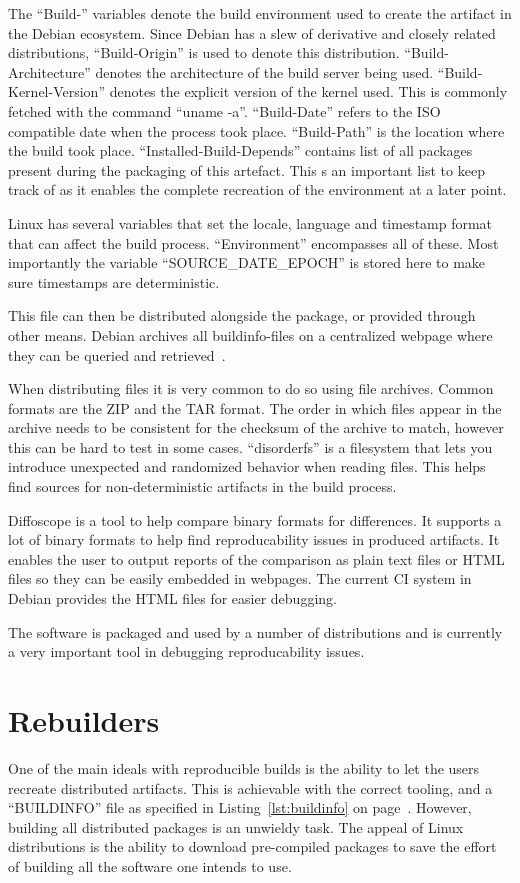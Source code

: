 \documentclass[../Main/thesis.tex]{subfiles}
\begin{document}
The ``Build-'' variables denote the build environment used to create the
artifact in the Debian ecosystem. Since Debian has a slew of derivative and
closely related distributions, ``Build-Origin'' is used to denote this
distribution.  ``Build-Architecture'' denotes the architecture of the build
server being used.  ``Build-Kernel-Version'' denotes the explicit  version of
the kernel used. This is commonly fetched with the command ``uname -a''.
``Build-Date'' refers to the ISO compatible date when the process took place.
``Build-Path'' is the location where the build took place.
``Installed-Build-Depends'' contains list of all packages present during the
packaging of this artefact. This s an important list to keep track of as it
enables the complete recreation of the environment at a later point.

Linux has several variables that set the locale, language and timestamp format
that can affect the build process. ``Environment'' encompasses all of these.
Most importantly the variable ``SOURCE\_DATE\_EPOCH'' is stored here to make
sure timestamps are deterministic.

This file can then be distributed alongside the package, or provided through
other means. Debian archives all buildinfo-files on a centralized webpage where
they can be queried and retrieved~\cite{buildinfo-debian}.

When distributing files it is very common to do so using file archives. Common
formats are the ZIP and the TAR format. The order in which files appear in the
archive needs to be consistent for the checksum of the archive to match, however
this can be hard to test in some cases. ``disorderfs'' is a filesystem that lets
you introduce unexpected and randomized behavior when reading files. This helps
find sources for non-deterministic artifacts in the build process.

Diffoscope is a tool to help compare binary formats for differences. It supports
a lot of binary formats to help find reproducability issues in produced
artifacts. It enables the user to output reports of the comparison as plain text
files or HTML files so they can be easily embedded in webpages. The current CI
system in Debian provides the HTML files for easier debugging.

The software is packaged and used by a number of distributions and is currently
a very important tool in debugging reproducability issues.


\section{Rebuilders}%
\label{sec:rebuilders} 
One of the main ideals with reproducible builds is the ability to let the users
recreate distributed artifacts. This is achievable with the correct tooling, and
a ``BUILDINFO'' file as specified in Listing~\ref{lst:buildinfo} on
page~\pageref{lst:buildinfo}. However, building all distributed packages is an
unwieldy task. The appeal of Linux distributions is the ability to download
pre-compiled packages to save the effort of building all the software one
intends to use.
\end{document}
